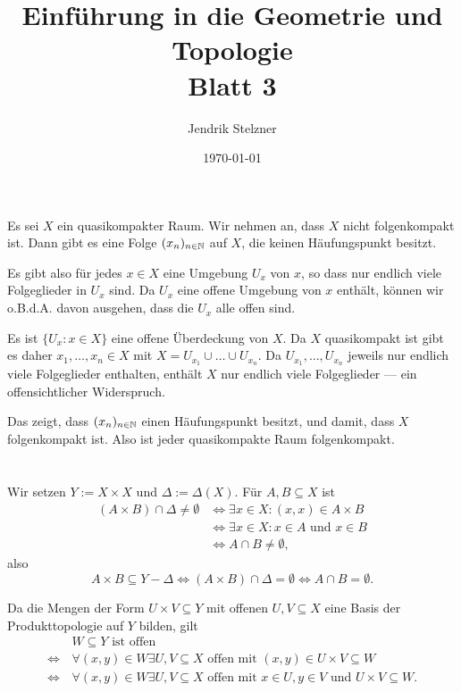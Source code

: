 \documentclass[a4paper,10pt]{article}
\title{\sc Einführung in die Geometrie und Topologie \\ \Large Blatt 3}
\author{Jendrik Stelzner}
\date{\today}
\begin{document}
\maketitle





\section{}
Es sei $X$ ein quasikompakter Raum. Wir nehmen an, dass $X$ nicht folgenkompakt ist. Dann gibt es eine Folge $(x_n)_{n \in \mathbb{N}}$ auf $X$, die keinen Häufungspunkt besitzt.

Es gibt also für jedes $x \in X$ eine Umgebung $U_x$ von $x$, so dass nur endlich viele Folgeglieder in $U_x$ sind. Da $U_x$ eine offene Umgebung von $x$ enthält, können wir o.B.d.A. davon ausgehen, dass die $U_x$ alle offen sind.

Es ist $\{U_x : x \in X\}$ eine offene Überdeckung von $X$. Da $X$ quasikompakt ist gibt es daher $x_1, \ldots, x_n \in X$ mit $X = U_{x_1} \cup \ldots \cup U_{x_n}$. Da $U_{x_1}, \ldots, U_{x_n}$ jeweils nur endlich viele Folgeglieder enthalten, enthält $X$ nur endlich viele Folgeglieder — ein offensichtlicher Widerspruch.

Das zeigt, dass $(x_n)_{n \in \mathbb{N}}$ einen Häufungspunkt besitzt, und damit, dass $X$ folgenkompakt ist. Also ist jeder quasikompakte Raum folgenkompakt.





\section{}
Wir setzen $Y := X \times X$ und $\Delta := \Delta(X)$. Für $A,B \subseteq X$ ist
\begin{align*}
                  (A \times B) \cap \Delta \neq \emptyset
 &\Leftrightarrow \exists x \in X : (x,x) \in A \times B \\
 &\Leftrightarrow \exists x \in X : x \in A \text{ und } x \in B \\
 &\Leftrightarrow A \cap B \neq \emptyset,
\end{align*}
also
\[
 A \times B \subseteq Y-\Delta
 \Leftrightarrow (A \times B) \cap \Delta = \emptyset
 \Leftrightarrow A \cap B = \emptyset.
\]

Da die Mengen der Form $U \times V \subseteq Y$ mit offenen $U, V \subseteq X$ eine Basis der Produkttopologie auf $Y$ bilden, gilt
\begin{align*}
                &\, W \subseteq Y \text{ ist offen} \\
 \Leftrightarrow&\, \forall (x,y) \in W \exists U,V \subseteq X \text{ offen mit } (x,y) \in U \times V \subseteq W \\
 \Leftrightarrow&\, \forall (x,y) \in W \exists U,V \subseteq X \text{ offen mit } x \in U, y \in V \text{ und } U \times V \subseteq W.
\end{align*}
\end{document}
